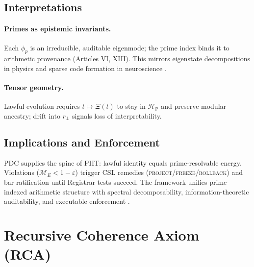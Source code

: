 \documentclass[12pt]{amsart}
\theoremstyle{plain}
\begin{document}
\subsection{Interpretations}
\paragraph{Primes as epistemic invariants.}
Each $\phi_p$ is an irreducible, auditable eigenmode; the prime index binds it to arithmetic provenance (Articles VI, XIII). This mirrors eigenstate decompositions in physics \cite{nielsen2010quantum} and sparse code formation in neuroscience \cite{olshausen1996emergence}.

\paragraph{Tensor geometry.}
Lawful evolution requires $t\mapsto \Xi(t)$ to stay in $\mathcal{H}_{\mathbb{P}}$ and preserve modular ancestry; drift into $r_\perp$ signals loss of interpretability.

\subsection{Implications and Enforcement}
PDC supplies the spine of PIIT: lawful identity equals prime-resolvable energy. Violations ($\mathcal{M}_E<1-\varepsilon$) trigger CSL remedies (\textsc{project}/\textsc{freeze}/\textsc{rollback}) and bar ratification until Registrar tests succeed. The framework unifies prime-indexed arithmetic structure with spectral decomposability, information-theoretic auditability, and executable enforcement \cite{cover2006elements,diamond2005first,iwaniec2002spectral}.

\section{Recursive Coherence Axiom (RCA)}
\end{document}
